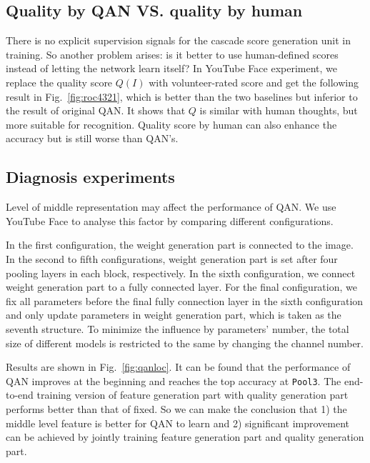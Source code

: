 \subsection{ Quality by QAN VS. quality by human}
\label{sec:humanscorebetter}
There is no explicit supervision signals for the cascade score generation unit in training. So another problem arises: is it better to use human-defined scores instead of letting the network learn itself? In YouTube Face experiment, we replace the quality score $Q(I)$ with volunteer-rated score and get the following result in Fig.~\ref{fig:roc4321}, which is better than the two baselines but inferior to the result of original QAN. It shows that $Q$ is similar with human thoughts, but more suitable for recognition. Quality score by human can also enhance the accuracy but is still worse than QAN's.



\subsection{Diagnosis experiments}
Level of middle representation may affect the performance of QAN. We use YouTube Face to analyse this factor by comparing different configurations.



In the first configuration, the weight generation part is connected to the image. In the second to fifth configurations, weight generation part is set after four pooling layers in each block, respectively. In the sixth configuration, we connect weight generation part to a fully connected layer. For the final configuration, we fix all parameters before the final fully connection layer in the sixth configuration and only update parameters in weight generation part, which is taken as the seventh structure. To minimize the influence by parameters' number, the total size of different models is restricted to the same by changing the channel number. 

Results are shown in Fig.~\ref{fig:qanloc}. It can be found that the performance of QAN improves at the beginning and reaches the top accuracy at \texttt{Pool3}. The end-to-end training version of feature generation part with quality generation part performs better than that of fixed. So we can make the conclusion that 1) the middle level feature is better for QAN to learn and 2) significant improvement can be achieved by jointly training feature generation part and quality generation part.